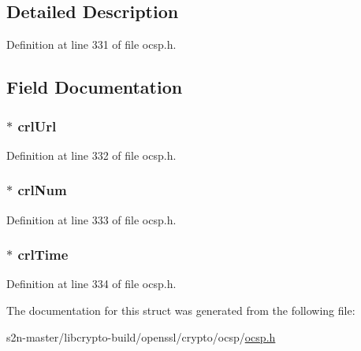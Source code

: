 \subsection{Detailed Description}


Definition at line 331 of file ocsp.\+h.



\subsection{Field Documentation}
\subsubsection[{\texorpdfstring{crl\+Url}{crlUrl}}]{ $\ast$ crl\+Url}\hypertarget{structocsp__crl__id__st_aa6926655bdd63112ca018d51fb103297}{}\label{structocsp__crl__id__st_aa6926655bdd63112ca018d51fb103297}


Definition at line 332 of file ocsp.\+h.

\subsubsection[{\texorpdfstring{crl\+Num}{crlNum}}]{ $\ast$ crl\+Num}\hypertarget{structocsp__crl__id__st_ae6ffaabc958161934fbecacda433785e}{}\label{structocsp__crl__id__st_ae6ffaabc958161934fbecacda433785e}


Definition at line 333 of file ocsp.\+h.

\subsubsection[{\texorpdfstring{crl\+Time}{crlTime}}]{ $\ast$ crl\+Time}\hypertarget{structocsp__crl__id__st_a5072cce8653ccbb6ea9497d107636de8}{}\label{structocsp__crl__id__st_a5072cce8653ccbb6ea9497d107636de8}


Definition at line 334 of file ocsp.\+h.



The documentation for this struct was generated from the following file\+:\begin{DoxyCompactItemize}
\item 
s2n-\/master/libcrypto-\/build/openssl/crypto/ocsp/\hyperlink{crypto_2ocsp_2ocsp_8h}{ocsp.\+h}\end{DoxyCompactItemize}
